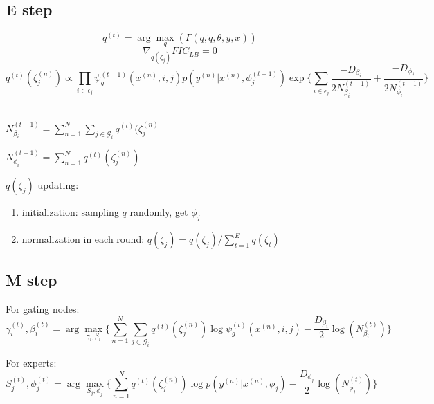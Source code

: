 \documentclass{article}
\begin{document}
\subsection{E step}
$$ q^{(t)} = \arg\max_q(\Gamma(q,\tilde{q},\theta,y,x)) $$
$$ \nabla_{q(\zeta_j)} FIC_{LB}= 0 $$
$$ q^{(t)}(\zeta_j^{(n)}) \propto \prod_{i \in \epsilon_j} 
	\psi_g^{(t-1)} (x^{(n)},i,j) p(y^{(n)}|x^{(n)},\phi_j^{(t-1)}) 
		\exp \{ \sum_{i \in \epsilon_j} 
			\frac{-D_{\beta_i}}{2N_{\beta_i}^{(t-1)}} +
				\frac{-D_{\phi_j}}{2N_{\phi_i}^{(t-1)}} \} $$ \\
\begin{description}
\setlength{\itemindent}{20em}
\item $ N_{\beta_i}^{(t-1)} = \sum_{n=1}^{N}\sum_{j \in \mathcal{G}_i} 
	q^{(t)} (\zeta_j^{(n)} $ \\
\item $ N_{\phi_i}^{(t-1)} = \sum_{n=1}^{N}	q^{(t)} (\zeta_j^{(n)}) $
\end{description}
				
$ q(\zeta_j) $ updating: \\
\begin{enumerate}
\item initialization: sampling $q$ randomly, get $\phi_j$ 
\item normalization in each round: $ q(\zeta_j) = q(\zeta_j)/\sum_{t=1}^{E} q(\zeta_t) $ \\
\end{enumerate}


\subsection{M step}
For gating nodes: \\
$$ \gamma_i^{(t)},\beta_i^{(t)} = \arg\max_{\gamma_i,\beta_i} 
	\{ \sum_{n=1}^{N}
	\sum_{j \in \mathcal{G}_i}q^{(t)}(\zeta_j^{(n)})
	\log\psi_g^{(t)} (x^{(n)},i,j)
	-\frac{D_{\beta_i}}{2}\log(N_{\beta_i}^{(t)})
	 \} $$ 
	 
For experts: \\
$$ S_j^{(t)}, \phi_j^{(t)} = \arg\max_{S_j,\phi_j}
	\{   \sum_{n=1}^{N}q^{(t)}(\zeta_j^{(n)})
	\log p(y^{(n)} | x^{(n)},\phi_j)
	-\frac{D_{\phi_j}}{2}\log(N_{\phi_j}^{(t)})
	\} $$	 
\end{document}
